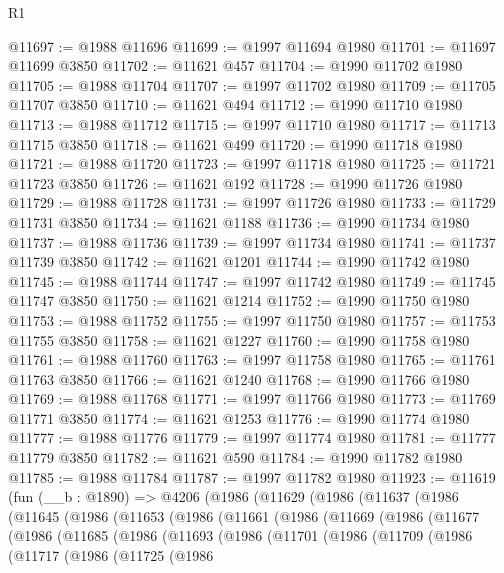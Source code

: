 \begin{lexlean}{R1}
\begin{coremodule}
@11697 := @1988 @11696
@11699 := @1997 @11694 @1980
@11701 := @11697 @11699 @3850
@11702 := @11621 @457
@11704 := @1990 @11702 @1980
@11705 := @1988 @11704
@11707 := @1997 @11702 @1980
@11709 := @11705 @11707 @3850
@11710 := @11621 @494
@11712 := @1990 @11710 @1980
@11713 := @1988 @11712
@11715 := @1997 @11710 @1980
@11717 := @11713 @11715 @3850
@11718 := @11621 @499
@11720 := @1990 @11718 @1980
@11721 := @1988 @11720
@11723 := @1997 @11718 @1980
@11725 := @11721 @11723 @3850
@11726 := @11621 @192
@11728 := @1990 @11726 @1980
@11729 := @1988 @11728
@11731 := @1997 @11726 @1980
@11733 := @11729 @11731 @3850
@11734 := @11621 @1188
@11736 := @1990 @11734 @1980
@11737 := @1988 @11736
@11739 := @1997 @11734 @1980
@11741 := @11737 @11739 @3850
@11742 := @11621 @1201
@11744 := @1990 @11742 @1980
@11745 := @1988 @11744
@11747 := @1997 @11742 @1980
@11749 := @11745 @11747 @3850
@11750 := @11621 @1214
@11752 := @1990 @11750 @1980
@11753 := @1988 @11752
@11755 := @1997 @11750 @1980
@11757 := @11753 @11755 @3850
@11758 := @11621 @1227
@11760 := @1990 @11758 @1980
@11761 := @1988 @11760
@11763 := @1997 @11758 @1980
@11765 := @11761 @11763 @3850
@11766 := @11621 @1240
@11768 := @1990 @11766 @1980
@11769 := @1988 @11768
@11771 := @1997 @11766 @1980
@11773 := @11769 @11771 @3850
@11774 := @11621 @1253
@11776 := @1990 @11774 @1980
@11777 := @1988 @11776
@11779 := @1997 @11774 @1980
@11781 := @11777 @11779 @3850
@11782 := @11621 @590
@11784 := @1990 @11782 @1980
@11785 := @1988 @11784
@11787 := @1997 @11782 @1980
@11923 := @11619
    (fun (__b : @1890) =>
    @4206
      (@1986
        (@11629
          (@1986
            (@11637
              (@1986
                (@11645
                  (@1986
                    (@11653
                      (@1986
                        (@11661
                          (@1986
                            (@11669
                              (@1986
                                (@11677
                                  (@1986
                                    (@11685
                                      (@1986
                                        (@11693
                                          (@1986
                                            (@11701
                                              (@1986
                                                (@11709
                                                  (@1986
                                                    (@11717
                                                      (@1986
                                                        (@11725
                                                          (@1986

\end{coremodule}
\end{lexlean}
